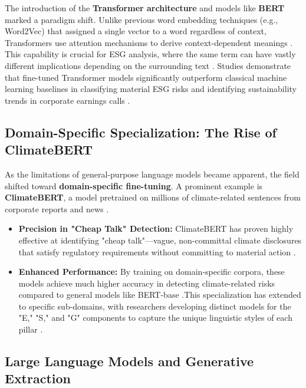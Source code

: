 The introduction of the \textbf{Transformer architecture} and models like \textbf{BERT} marked a paradigm shift. Unlike previous word embedding techniques (e.g., Word2Vec) that assigned a single vector to a word regardless of context, Transformers use attention mechanisms to derive context-dependent meanings  \parencite{frederik_maibaum_b8629037}. This capability is crucial for ESG analysis, where the same term can have vastly different implications depending on the surrounding text  \parencite{natraj_raman_009776f2}. Studies demonstrate that fine-tuned Transformer models significantly outperform classical machine learning baselines in classifying material ESG risks and identifying sustainability trends in corporate earnings calls  \parencite[]{tae_sun_chung_e16a4c18, natraj_raman_009776f2}.
\subsection{ Domain-Specific Specialization: The Rise of ClimateBERT}

As the limitations of general-purpose language models became apparent, the field shifted toward \textbf{domain-specific fine-tuning}. A prominent example is \textbf{ClimateBERT}, a model pretrained on millions of climate-related sentences from corporate reports and news  \parencite[]{tobias_schimanski_4e192ec5, julia_bingler_268445e3}.
\begin{itemize}
\item 

\textbf{Precision in "Cheap Talk" Detection:} ClimateBERT has proven highly effective at identifying "cheap talk"—vague, non-committal climate disclosures that satisfy regulatory requirements without committing to material action  \parencite{julia_bingler_268445e3}.\item 

\textbf{Enhanced Performance:} By training on domain-specific corpora, these models achieve much higher accuracy in detecting climate-related risks compared to general models like BERT-base  \parencite[]{tae_sun_chung_e16a4c18, julia_bingler_268445e3}.This specialization has extended to specific sub-domains, with researchers developing distinct models for the "E," "S," and "G" components to capture the unique linguistic styles of each pillar  \parencite{tobias_schimanski_4e192ec5}.
\end{itemize}
\subsection{ Large Language Models and Generative Extraction}

